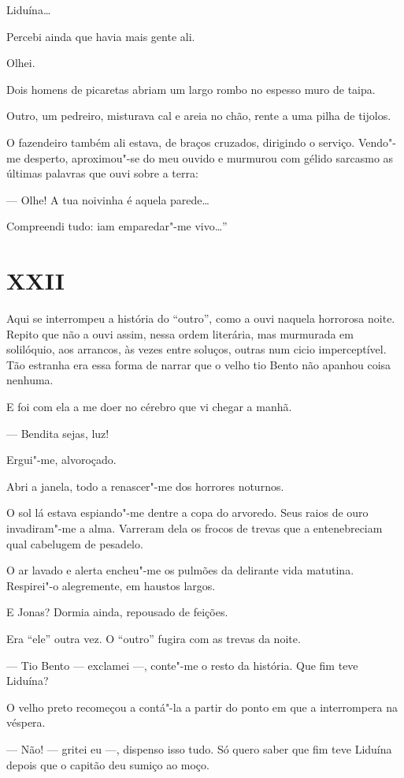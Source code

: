 Liduína\ldots{}

Percebi ainda que havia mais gente ali.

Olhei.

Dois homens de picaretas abriam um largo rombo no espesso muro de taipa.

Outro, um pedreiro, misturava cal e areia no chão, rente a uma pilha de
tijolos.

O fazendeiro também ali estava, de braços cruzados, dirigindo o serviço.
Vendo"-me desperto, aproximou"-se do meu ouvido e murmurou com gélido
sarcasmo as últimas palavras que ouvi sobre a terra:

--- Olhe! A tua noivinha é aquela parede\ldots{}

Compreendi tudo: iam emparedar"-me vivo\ldots{}''

\section*{XXII}

Aqui se interrompeu a história do ``outro'', como a ouvi naquela
horrorosa noite. Repito que não a ouvi assim, nessa ordem literária, mas
murmurada em solilóquio, aos arrancos, às vezes entre soluços, outras
num cicio imperceptível. Tão estranha era essa forma de narrar que o
velho tio Bento não apanhou coisa nenhuma.

E foi com ela a me doer no cérebro que vi chegar a manhã.

--- Bendita sejas, luz!

Ergui"-me, alvoroçado.

Abri a janela, todo a renascer"-me dos horrores noturnos.

O sol lá estava espiando"-me dentre a copa do arvoredo. Seus raios de
ouro invadiram"-me a alma. Varreram dela os frocos de trevas que a
entenebreciam qual cabelugem de pesadelo.

O ar lavado e alerta encheu"-me os pulmões da delirante vida matutina.
Respirei"-o alegremente, em haustos largos.

E Jonas? Dormia ainda, repousado de feições.

Era ``ele'' outra vez. O ``outro'' fugira com as trevas da noite.

--- Tio Bento --- exclamei ---, conte"-me o resto da história. Que fim
teve Liduína?

O velho preto recomeçou a contá"-la a partir do ponto em que a
interrompera na véspera.

--- Não! --- gritei eu ---, dispenso isso tudo. Só quero saber que fim
teve Liduína depois que o capitão deu sumiço ao moço.

